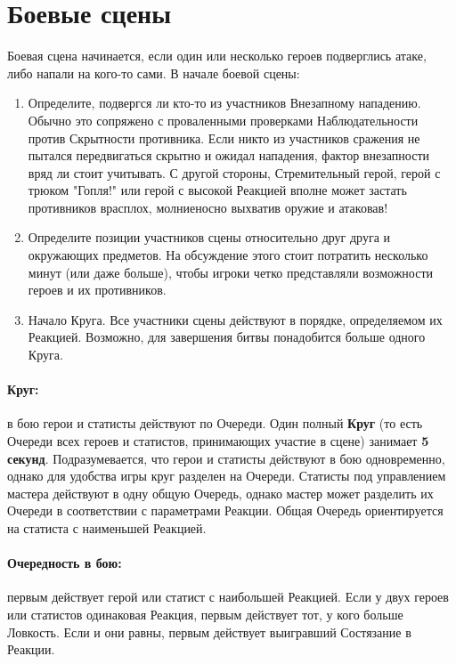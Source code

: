 \section{Боевые сцены}
Боевая сцена начинается, если один или несколько героев подверглись атаке, либо напали на кого-то сами. В начале боевой сцены:
\begin{enumerate}
\item Определите, подвергся ли кто-то из участников Внезапному нападению. Обычно это сопряжено с проваленными проверками Наблюдательности против Скрытности противника. Если никто из участников сражения не пытался передвигаться скрытно и ожидал нападения, фактор внезапности вряд ли стоит учитывать. С другой стороны, Стремительный герой, герой с трюком "Гопля!" или герой с высокой Реакцией вполне может застать противников врасплох, молниеносно выхватив оружие и атаковав!
\item Определите позиции участников сцены относительно друг друга и окружающих предметов. На обсуждение этого стоит потратить несколько минут (или даже больше), чтобы игроки четко представляли возможности героев и их противников.
\item Начало Круга. Все участники сцены действуют в порядке, определяемом их Реакцией. Возможно, для завершения битвы понадобится больше одного Круга.
\end{enumerate}
\paragraph{Круг:} в бою герои и статисты действуют по Очереди. Один полный \textbf{Круг} (то есть Очереди всех героев и статистов, принимающих участие в сцене) занимает \textbf{5 секунд}. Подразумевается, что герои и статисты действуют в бою одновременно, однако для удобства игры круг разделен на Очереди. Статисты под управлением мастера действуют в одну общую Очередь, однако мастер может разделить их Очереди в соответствии с параметрами Реакции. Общая Очередь ориентируется на статиста с наименьшей Реакцией.
\paragraph{Очередность в бою:} первым действует герой или статист с наибольшей Реакцией. Если у двух героев или статистов одинаковая Реакция, первым действует тот, у кого больше Ловкость. Если и они равны, первым действует выигравший Состязание в Реакции.
